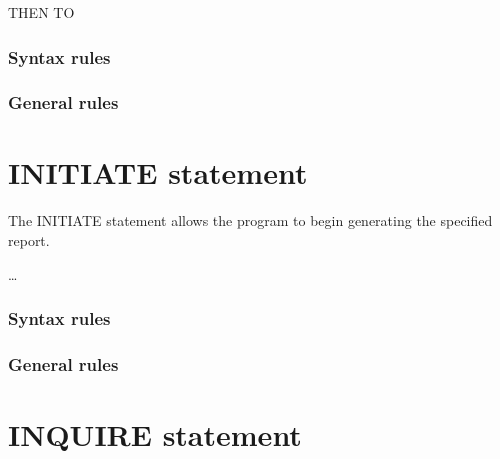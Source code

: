 \begin{syntax}
  \begin{0-1}
    THEN TO 
  \end{0-1}
\end{syntax}

\subsubsection{Syntax rules}

\subsubsection{General rules}

\section{INITIATE statement}

The INITIATE statement allows the program to begin generating the specified report.

\begin{syntax}
  \begin{1=}
    \reportname
  \end{1=} \ldots
\end{syntax}

\subsubsection{Syntax rules}

\subsubsection{General rules}

\section{INQUIRE statement}

\begin{syntax}[\miscextcolour]
\end{syntax}

